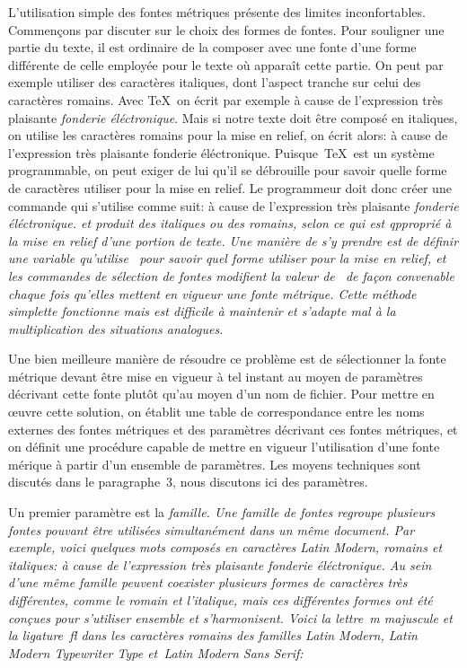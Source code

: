 L'utilisation simple des fontes métriques présente des limites
inconfortables. Commençons par discuter sur le choix des formes de
fontes. Pour souligner une partie du texte, il est ordinaire de la
composer avec une fonte d'une forme différente de celle employée pour
le texte où apparaît cette partie. On peut par exemple utiliser des
caractères italiques, dont l'aspect tranche sur celui des caractères
romains. Avec \TeX\ on écrit par exemple
\beginverbatim
à cause de l'expression très plaisante {\it fonderie éléctronique}.
\endverbatim
Mais si notre texte doit être composé en italiques, on utilise les
caractères romains pour la mise en relief, on écrit alors:
\beginverbatim
à cause de l'expression très plaisante {\rm fonderie éléctronique}.
\endverbatim
Puisque~\TeX\ est un système programmable, on peut exiger de lui qu'il
se débrouille pour savoir quelle forme de caractères utiliser pour la
mise en relief. Le programmeur doit donc créer une commande 
qui s'utilise comme suit:
\beginverbatim
à cause de l'expression très plaisante \em{fonderie éléctronique}.
\endverbatim
et produit des italiques ou des romains, selon ce qui est qpproprié à
la mise en relief d'une portion de texte. Une manière de s'y prendre
est de définir une variable  qu'utilise~ pour
savoir quel forme utiliser pour la mise en relief, et les commandes de
sélection de fontes modifient la valeur de~ de façon
convenable chaque fois qu'elles mettent en vigueur une fonte métrique.
Cette méthode simplette fonctionne mais est difficile à maintenir et
s'adapte mal à la multiplication des situations analogues.

Une bien meilleure manière de résoudre ce problème est de sélectionner
la fonte métrique devant être mise en vigueur à tel instant au moyen
de paramètres décrivant cette fonte plutôt qu'au moyen d'un nom de
fichier. Pour mettre en œuvre cette solution, on établit une table de
correspondance entre les noms externes des fontes métriques et des
paramètres décrivant ces fontes métriques, et on définit une procédure
capable de mettre en vigueur l'utilisation d'une fonte mérique à
partir d'un ensemble de paramètres. Les moyens techniques sont
discutés dans le paragraphe~3, nous discutons ici des paramètres.

Un premier paramètre est la \em{famille}. Une famille de fontes
regroupe plusieurs fontes pouvant être utilisées simultanément dans un
même document. Par exemple, voici quelques mots composés en caractères
\em{Latin Modern,} romains et italiques:
\begindisplay
à cause de l'expression très plaisante \em{fonderie éléctronique}.
\enddisplay
\noindent
Au sein d'une même famille peuvent coexister plusieurs formes de
caractères très différentes, comme le romain et l'italique, mais ces
différentes formes ont été conçues pour s'utiliser ensemble et
s'harmonisent. Voici la lettre~\em{m} majuscule et la ligature~{fl}
dans les caractères romains des familles \em{Latin Modern}, \em{Latin
  Modern Typewriter Type} et~\em{Latin Modern Sans Serif}:

